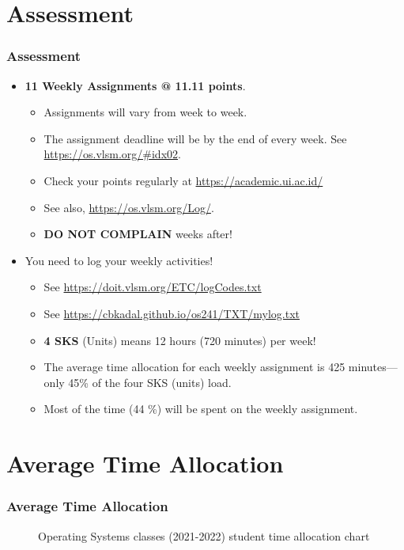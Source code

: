 \documentclass[aspectratio=169, xcolor=table, notheorems, hyperref={pdfpagelabels=false}]{beamer}
\begin{document}
\section{Assessment}
\begin{frame}
\frametitle{Assessment}
\begin{itemize}
\item \textbf{11 Weekly Assignments @ 11.11 points}.
\begin{itemize}
\item Assignments will vary from week to week.
\item The assignment deadline will be by the end of every week. 
See \url{https://os.vlsm.org/\#idx02}.
\item Check your points regularly at \url{https://academic.ui.ac.id/}
\item See also, \url{https://os.vlsm.org/Log/}.
\item \textbf{DO NOT COMPLAIN} weeks after! 
\end{itemize}
\item You need to log your weekly activities!
\begin{itemize}
\item See \url{https://doit.vlsm.org/ETC/logCodes.txt}
\item See \url{https://cbkadal.github.io/os241/TXT/mylog.txt}
\item \textbf{4 SKS} (Units) means 12 hours (720 minutes) per week!
\item The average time allocation for each weekly assignment is 
      425 minutes—only 45\% of the four SKS (units) load.
\item Most of the time (44 \%) will be spent on the weekly assignment.
\end{itemize}
\end{itemize}

\end{frame}

\section{Average Time Allocation}
\begin{frame}
\frametitle{Average Time Allocation}

\begin{figure}
\caption{Operating Systems classes (2021-2022) student time allocation chart}
\end{figure}

\end{frame}
\end{document}
